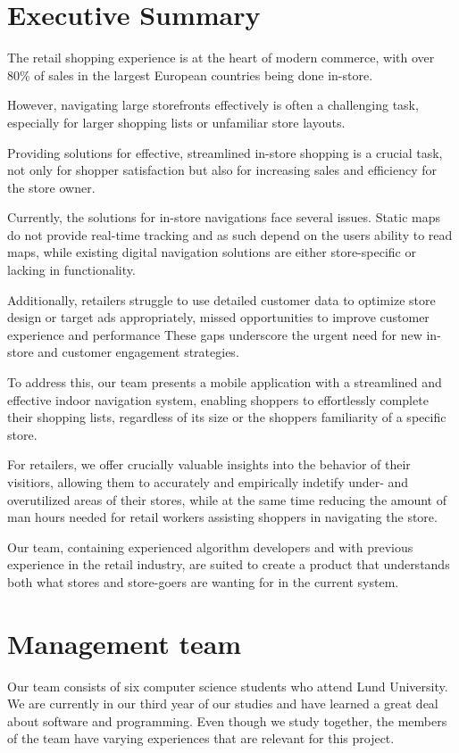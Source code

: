 \documentclass[titlepage]{article}
\begin{document}
\section{Executive Summary}
The retail shopping experience is at the heart of modern commerce, with over 80\% of sales in the largest European countries being done in-store.\cite{statista1}

However, navigating large storefronts effectively is often a challenging task, especially for larger shopping lists or unfamiliar store layouts.

Providing solutions for effective, streamlined in-store shopping is a crucial task, not only for shopper satisfaction but also for increasing sales and efficiency for the store owner.

Currently, the solutions for in-store navigations face several issues. Static maps do not provide real-time tracking and as such depend on the users ability to read maps, while existing digital navigation solutions are either store-specific or lacking in functionality.

Additionally, retailers struggle to use detailed customer data to optimize store design or target ads appropriately, missed opportunities to improve customer experience and performance These gaps underscore the urgent need for new in-store and customer engagement strategies.

To address this, our team presents a mobile application with a streamlined and effective indoor navigation system, enabling shoppers to effortlessly complete their shopping lists, regardless of its size or the shoppers familiarity of a specific store.

For retailers, we offer crucially valuable insights into the behavior of their visitiors, allowing them to accurately and empirically indetify under- and overutilized areas of their stores, 
while at the same time reducing the amount of man hours needed for retail workers assisting shoppers in navigating the store.


Our team, containing experienced algorithm developers and with previous experience in the retail industry, are suited to create a product that understands both what stores and store-goers are wanting for in the current system.

\section{Management team}
Our team consists of six computer science students who attend Lund University. We are currently in our third year of our studies and have learned a great deal about software and programming. Even though we study together, the members of the team have varying experiences that are relevant for this project.
\end{document}
